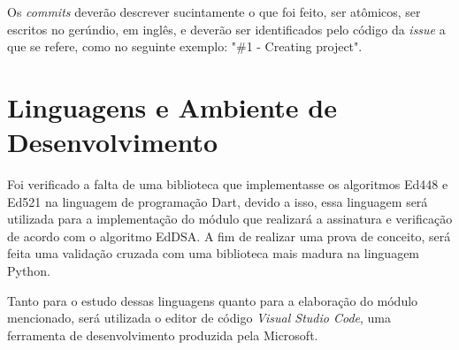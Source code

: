 Os \textit{commits} deverão descrever sucintamente o que foi feito, ser atômicos, ser escritos no gerúndio, em inglês, e deverão ser identificados pelo código da \textit{issue} a que se refere, como no seguinte exemplo: "\#1 - Creating project".

\section{Linguagens e Ambiente de Desenvolvimento}

Foi verificado a falta de uma biblioteca que implementasse os algoritmos Ed448 e Ed521 na linguagem de programação Dart, devido a isso, essa linguagem será utilizada para a implementação do módulo que realizará a assinatura e verificação de acordo com o algoritmo EdDSA. A fim de realizar uma prova de conceito, será feita uma validação cruzada com uma biblioteca mais madura na linguagem Python. 

Tanto para o estudo dessas linguagens quanto para a elaboração do módulo mencionado, será utilizada o editor de código \textit{Visual Studio Code}, uma ferramenta de desenvolvimento produzida pela Microsoft.